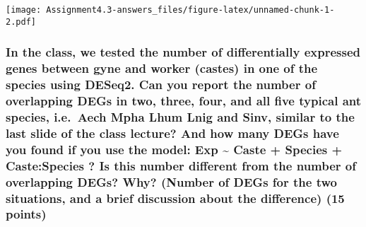 \documentclass[]{article}
\begin{document}
\texttt{[image: Assignment4.3-answers\_files/figure-latex/unnamed-chunk-1-2.pdf]}

\subsubsection{In the class, we tested the number of differentially
expressed genes between gyne and worker (castes) in one of the species
using DESeq2. Can you report the number of overlapping DEGs in two,
three, four, and all five typical ant species, i.e.~Aech Mpha Lhum Lnig
and Sinv, similar to the last slide of the class lecture? And how many
DEGs have you found if you use the model: Exp \textasciitilde{} Caste +
Species + Caste:Species ? Is this number different from the number of
overlapping DEGs? Why? (Number of DEGs for the two situations, and a
brief discussion about the difference) (15
points)}\label{in-the-class-we-tested-the-number-of-differentially-expressed-genes-between-gyne-and-worker-castes-in-one-of-the-species-using-deseq2.-can-you-report-the-number-of-overlapping-degs-in-two-three-four-and-all-five-typical-ant-species-i.e.aech-mpha-lhum-lnig-and-sinv-similar-to-the-last-slide-of-the-class-lecture-and-how-many-degs-have-you-found-if-you-use-the-model-exp-caste-species-castespecies-is-this-number-different-from-the-number-of-overlapping-degs-why-number-of-degs-for-the-two-situations-and-a-brief-discussion-about-the-difference-15-points}
\end{document}

